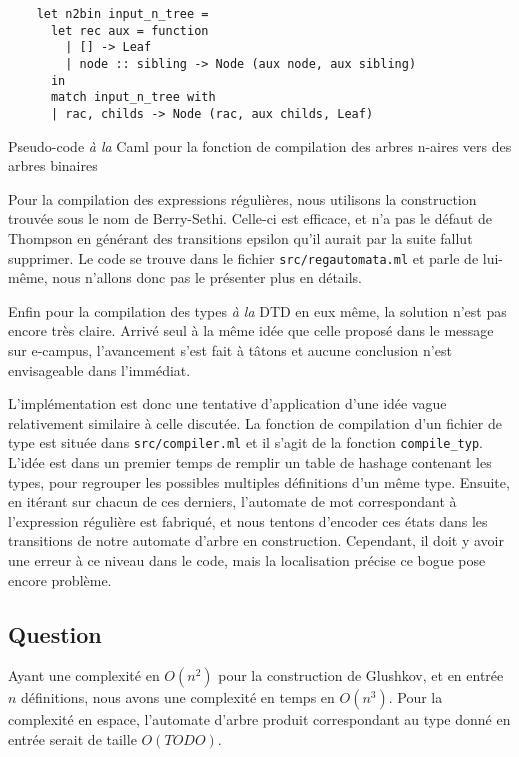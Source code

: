 \documentclass[twoside,12pt]{article}
\begin{document}
\begin{algorithm}
    \bigskip
\begin{verbatim}
    let n2bin input_n_tree =
      let rec aux = function
        | [] -> Leaf
        | node :: sibling -> Node (aux node, aux sibling)
      in
      match input_n_tree with
      | rac, childs -> Node (rac, aux childs, Leaf)
\end{verbatim}
   \caption{\small Pseudo-code \textit{à la} Caml pour la fonction de compilation des arbres
   n-aires vers des arbres binaires}
\end{algorithm}

Pour la compilation des expressions régulières, nous utilisons la construction trouvée sous
le nom de Berry-Sethi\footnotemark.
Celle-ci est efficace, et n'a pas le défaut de Thompson en générant des transitions
epsilon qu'il aurait par la suite fallut supprimer.
Le code se trouve dans le fichier \texttt{src/regautomata.ml} et parle de lui-même, nous n'allons
donc pas le présenter plus en détails.

Enfin pour la compilation des types \textit{à la} DTD en eux même,
la solution n'est pas encore très claire. Arrivé seul à la même idée
que celle proposé dans le message sur e-campus\footnotemark,
l'avancement s'est fait à tâtons et aucune conclusion n'est envisageable dans l'immédiat.

L'implémentation est donc une tentative d'application d'une idée vague relativement similaire à
celle discutée. La fonction de compilation d'un fichier de type est située dans
\texttt{src/compiler.ml} et il s'agit de la fonction \texttt{compile\_typ}.
L'idée est dans un premier temps de remplir un table de hashage contenant les types, pour
regrouper les possibles multiples définitions d'un même type. Ensuite, en itérant sur chacun
de ces derniers, l'automate de mot correspondant à l'expression régulière est fabriqué, et
nous tentons d'encoder ces états dans les transitions de notre automate d'arbre en construction.
Cependant, il doit y avoir une erreur à ce niveau dans le code, mais la localisation précise
ce bogue pose encore problème.



\subsection{Question}
Ayant une complexité en $O(n^2)$ pour la construction de Glushkov, et en entrée $n$ définitions,
nous avons une complexité en temps en $O(n^3)$\footnotemark.
Pour la complexité en espace, l'automate d'arbre produit correspondant
au type donné en entrée serait de taille $O(TODO)$.
\end{document}
